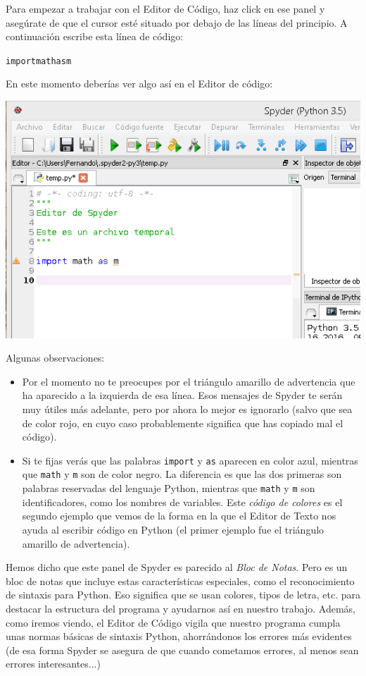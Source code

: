 \documentclass[10pt,a4paper]{article}\usepackage[]{graphicx}\usepackage[]{color}
\makeatletter
\newenvironment{kframe}{%
 \def\at@end@of@kframe{}%
 \ifinner\ifhmode%
  \def\at@end@of@kframe{\end{minipage}}%
  \begin{minipage}{\columnwidth}%
 \fi\fi%
 \def\FrameCommand##1{\hskip\@totalleftmargin \hskip-\fboxsep
 \colorbox{shadecolor}{##1}\hskip-\fboxsep
     \hskip-\linewidth \hskip-\@totalleftmargin \hskip\columnwidth}%
 \MakeFramed {\advance\hsize-\width
   \@totalleftmargin\z@ \linewidth\hsize
   \@setminipage}}%
 {\par\unskip\endMakeFramed%
 \at@end@of@kframe}
\newenvironment{knitrout}{}{} %
\newcounter {cont01}
\makeatother
\begin{document}
Para empezar a trabajar con el Editor de Código, haz click en ese panel y asegúrate de que el cursor esté situado por debajo de las líneas del principio. A continuación escribe esta línea de código:
\begin{knitrout}
\color{fgcolor}\begin{kframe}
\begin{alltt}
import math as m
\end{alltt}
\end{kframe}
\end{knitrout}
En este momento deberías ver algo así en el Editor de código:
\begin{center}
\includegraphics[width=14cm]{../fig/Tut-02-py-24-EditorSpyder01.png}
\end{center}
Algunas observaciones:
\begin{itemize}
  \item Por el momento no te preocupes por el triángulo amarillo de advertencia que ha aparecido a la izquierda de esa línea. Esos mensajes de Spyder te serán muy útiles más adelante, pero por ahora lo mejor es ignorarlo (salvo que sea de color rojo, en cuyo caso probablemente significa que has copiado mal el código).
  \item Si te fijas verás que las palabras {\tt import} y {\tt as} aparecen en color azul, mientras que {\tt math} y {\tt m} son de color negro. La diferencia es que las dos primeras son palabras reservadas del lenguaje Python, mientras que {\tt math} y {\tt m} son identificadores, como los nombres de variables. Este {\em código de colores} es el segundo ejemplo que vemos de la forma en la que el Editor de Texto nos ayuda al escribir código en Python (el primer ejemplo fue el triángulo amarillo de advertencia). 
\end{itemize}
Hemos dicho que este panel de Spyder es parecido al {\em Bloc de Notas}. Pero es un bloc de notas que incluye estas características especiales, como el {\sf reconocimiento de sintaxis} para Python. Eso significa que se usan colores, tipos de letra, etc. para destacar la estructura del programa y ayudarnos así en nuestro trabajo. Además, como iremos viendo, el Editor de Código vigila que nuestro programa cumpla unas normas básicas de sintaxis Python, ahorrándonos los errores más evidentes (de esa forma Spyder se asegura de que cuando cometamos errores, al menos sean errores interesantes...)
\end{document}
